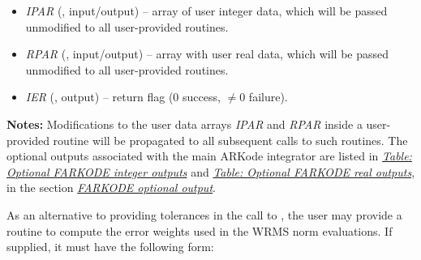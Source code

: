 \documentclass[letterpaper,10pt,english]{sphinxmanual}
\begin{document}
\begin{fulllineitems}
\begin{description}
\begin{itemize}
\item {} 
\emph{IPAR} (, input/output) -- array of user integer data, which will be passed
unmodified to all user-provided routines.

\item {} 
\emph{RPAR} (, input/output) -- array with user real data, which will be passed
unmodified to all user-provided routines.

\item {} 
\emph{IER} (, output) -- return flag (0 success, $\ne 0$ failure).

\end{itemize}

\end{description}

\textbf{Notes:} Modifications to the user data arrays \emph{IPAR} and \emph{RPAR}
inside a user-provided routine will be propagated to all
subsequent calls to such routines. The optional outputs
associated with the main ARKode integrator are listed in
{\hyperref[f_interface/Optional_output:finterface-iouttable]{\emph{Table: Optional FARKODE integer outputs}}} and {\hyperref[f_interface/Optional_output:finterface-routtable]{\emph{Table: Optional FARKODE real outputs}}}, in
the section {\hyperref[f_interface/Optional_output:finterface-optionaloutputs]{\emph{FARKODE optional output}}}.

\end{fulllineitems}


As an alternative to providing tolerances in the call to
{\hyperref[f_interface/Usage:f/_/FARKMALLOC]{}}, the user may provide a routine to compute the
error weights used in the WRMS norm evaluations.  If supplied, it must
have the following form:
\end{document}
